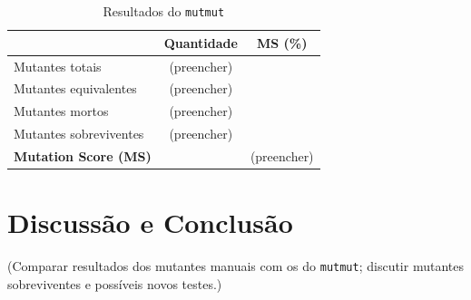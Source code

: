 \documentclass[11pt,a4paper]{article}
\begin{document}
\begin{table}[H]
  \centering
  \caption{Resultados do \texttt{mutmut}}
  \label{tab:mutmut}
  \begin{tabular}{lcc}
    \toprule
    & Quantidade & MS (\%) \\
    \midrule
    Mutantes totais                & (preencher) & \\
    Mutantes equivalentes           & (preencher) & \\
    Mutantes mortos                 & (preencher) & \\
    Mutantes sobreviventes          & (preencher) & \\
    \midrule
    \textbf{Mutation Score (MS)}    & & (preencher) \\
    \bottomrule
  \end{tabular}
\end{table}

\section{Discussão e Conclusão}

(Comparar resultados dos mutantes manuais com os do \texttt{mutmut};
discutir mutantes sobreviventes e possíveis novos testes.)
\end{document}

